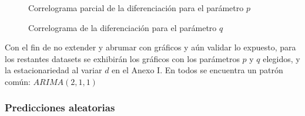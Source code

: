 \documentclass[a4paper,10pt]{article}
\begin{document}
\begin{figure}[H]
 \centering
  \caption{Correlograma parcial de la diferenciación para el parámetro $p$}
  \label{f:fac_btc_p}
\end{figure}

\begin{figure}[H]
 \centering
  \caption{Correlograma de la diferenciación para el parámetro $q$}
  \label{f:fac_btc_q}
\end{figure}

Con el fin de no extender y abrumar con gráficos y aún validar lo expuesto, para los restantes datasets se exhibirán los gráficos con los parámetros $p$ y $q$ elegidos, y la estacionariedad al variar $d$ en el Anexo I. En todos se encuentra un patrón común: $ARIMA(2,1,1)$

\subsubsection{Predicciones aleatorias}
\end{document}
